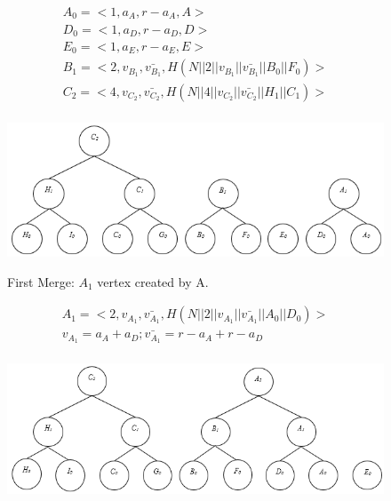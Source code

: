 \begin{exmp}
				\begin{equation}
					\begin{array}{l}
						A_{0} = <1, a_{A}, r - a_{A}, A>\\
						D_{0} = <1, a_{D}, r - a_{D}, D>\\
						E_{0} = <1, a_{E}, r - a_{E}, E>\\
						B_{1} = <2, v_{B_{1}}, \bar{v_{B_{1}}}, H(N || 2 || v_{B_{1}}|| \bar{v_{B_{1}}} || B_{0} || F_{0})>\\
						C_{2} = <4, v_{C_{2}}, \bar{v_{C_{2}}}, H(N || 4 || v_{C_{2}}|| \bar{v_{C_{2}}} || H_{1} || C_{1})>\\
					\end{array}
				\end{equation}
				\begin{figure}[h!]
					\centering
					\includegraphics[scale = 1]{images/commitment-tree-example-2-shia.png}\\
					\caption{First Merge: $A_{1}$ vertex created by A.}
					\label{fig:commitment-tree-example-2-shia}
				\end{figure}
				\begin{equation}
					\begin{array}{l}
						A_{1} = <2, v_{A_{1}}, \bar{v_{A_{1}}}, H(N || 2 || v_{A_{1}}|| \bar{v_{A_{1}}} || A_{0} || D_{0})>\\
						v_{A_{1}} = a_{A} + a_{D}; \bar{v_{A_{1}}} = r - a_{A} + r - a_{D}\\
					\end{array}
				\end{equation}
				\begin{figure}[h!]
					\centering
					\includegraphics[scale = 1]{images/commitment-tree-example-3-shia.png}\\

\end{figure}
\end{exmp}
